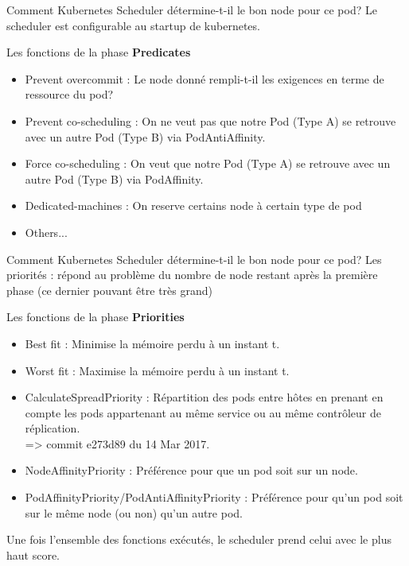\documentclass{bredelebeamer}
\begin{document}
\begin{frame}{Comment Kubernetes Scheduler détermine-t-il le bon node pour ce pod?}
Le scheduler est configurable au startup de kubernetes.
\begin{block}{Les fonctions de la phase \textbf{Predicates}}
\begin{itemize}
\item Prevent overcommit : Le node donné rempli-t-il les exigences en terme de ressource du pod?\\
\item Prevent co-scheduling : On ne veut pas que notre Pod (Type A) se retrouve avec un autre Pod (Type B) via PodAntiAffinity.\\
\item Force co-scheduling : On veut que notre Pod (Type A) se retrouve avec un autre Pod (Type B) via PodAffinity.
\item Dedicated-machines : On reserve certains node à certain type de pod
\item Others...
\end{itemize}
\end{block}
\end{frame}

\begin{frame}{Comment Kubernetes Scheduler détermine-t-il le bon node pour ce pod?}
Les priorités : répond au problème du nombre de node restant après la première phase (ce dernier pouvant être très grand)
\begin{block}{Les fonctions de la phase \textbf{Priorities}}
\begin{itemize}
\item Best fit : Minimise la mémoire perdu à un instant t.
\item Worst fit : Maximise la mémoire perdu à un instant t.
\item CalculateSpreadPriority : Répartition des pods entre hôtes en prenant en compte les pods appartenant au même service ou au même contrôleur de réplication. \\
=> commit e273d89 du 14 Mar 2017.
\item NodeAffinityPriority : Préférence pour que un pod soit sur un node.
\item PodAffinityPriority/PodAntiAffinityPriority : Préférence pour qu'un pod soit sur le même node (ou non) qu'un autre pod.
\end{itemize}
\end{block}
Une fois l'ensemble des fonctions exécutés, le scheduler prend celui avec le plus haut score.
\end{frame}
\end{document}
